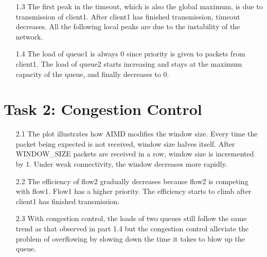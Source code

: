 \documentclass[11pt]{article}
\begin{document}
\begin{itemize}
    \item[1.3]
    The first peak in the timeout, which is also the global maximum, is due to transmission of client1. After client1 has finished transmission, timeout decreases. All the following local peaks are due to the instability of the network. 
    
    \item[1.4]
    The load of queue1 is always 0 since priority is given to packets from client1. The load of queue2 starts increasing and stays at the maximum capacity of the queue, and finally decreases to 0.
        
    \end{itemize}
    
    
    \vspace{40mm}
    
    
    
    
    
    
    
     \section*{Task 2: Congestion Control}
    \begin{itemize}
    \item[2.1]
    The plot illustrates how AIMD modifies the window size. Every time the packet being expected is not received, window size halves itself. After WINDOW\_SIZE packets are received in a row, window size is incremented by 1. Under weak connectivity, the window decreases more rapidly. 
    
    \item[2.2]
    The efficiency of flow2 gradually decreases because flow2 is competing with flow1. Flow1 has a higher priority. The efficiency starts to climb after client1 has finished transmission.
    
    \item[2.3]
    With congestion control, the loads of two queues still follow the same trend as that observed in part 1.4 but the congestion control alleviate the problem of overflowing by slowing down the time it takes to blow up the queue.
    
    \end{itemize}      
    
    
    
    \newpage
    
    
    
\end{document}
